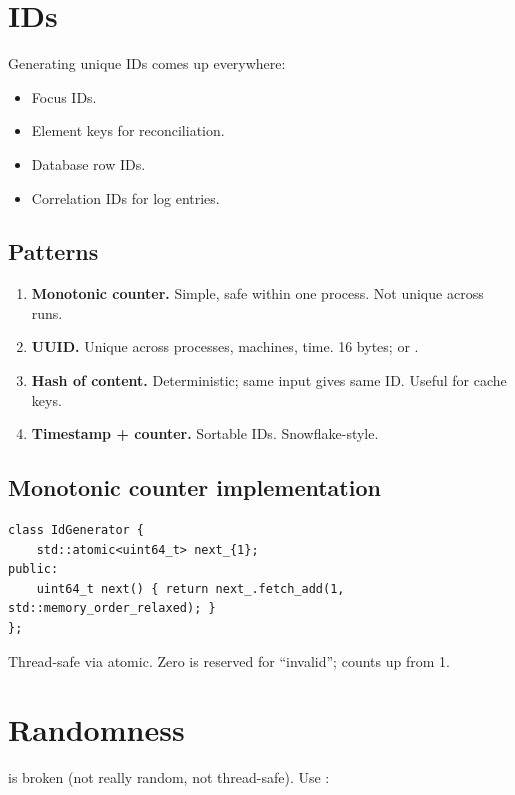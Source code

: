 \section{IDs}

Generating unique IDs comes up everywhere:

\begin{itemize}[leftmargin=*]
  \item Focus IDs.
  \item Element keys for reconciliation.
  \item Database row IDs.
  \item Correlation IDs for log entries.
\end{itemize}

\subsection*{Patterns}

\begin{enumerate}[leftmargin=*]
  \item \textbf{Monotonic counter.} Simple, safe within one
    process. Not unique across runs.
  \item \textbf{UUID.} Unique across processes, machines, time.
    16 bytes;  or .
  \item \textbf{Hash of content.} Deterministic; same input
    gives same ID. Useful for cache keys.
  \item \textbf{Timestamp + counter.} Sortable IDs.
    Snowflake-style.
\end{enumerate}

\subsection*{Monotonic counter implementation}

\begin{lstlisting}
class IdGenerator {
    std::atomic<uint64_t> next_{1};
public:
    uint64_t next() { return next_.fetch_add(1, std::memory_order_relaxed); }
};
\end{lstlisting}

Thread-safe via atomic. Zero is reserved for ``invalid'';
counts up from 1.

\section{Randomness}

 is broken (not really random, not thread-safe).
Use :

